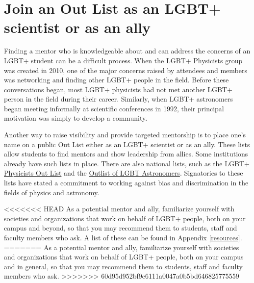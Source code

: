 \section {Join an Out List as an LGBT+ scientist or as an ally}
\label{outlist}
Finding a mentor who is knowledgeable about and can address the concerns of an LGBT+ student can be a difficult process. When the LGBT+ Physicists group was created in 2010, one of the major concerns raised by attendees and members was networking and finding other LGBT+ people in the field. Before these conversations began, most LGBT+ physicists had not met another LGBT+ person in the field during their career.  Similarly, when LGBT+ astronomers began meeting informally at scientific conferences in 1992, their principal motivation was simply to develop a community.

Another way to raise visibility and provide targeted mentorship is to place one's name on a public Out List either as an LGBT+ scientist or as an ally. These lists allow students to find mentors and show leadership from allies. Some institutions already have such lists in place. There are also national lists, such as the \href{http://lgbtphysicists.org/outlist.html}{LGBT+ Physicists Out List} and the \href{http://web.physics.ucsb.edu/~blaes/lgbtastro/}{Outlist of LGBT Astronomers}. Signatories to these lists have stated a commitment to working against bias and discrimination in the fields of physics and astronomy.

<<<<<<< HEAD
As a potential mentor and ally, familiarize yourself with societies and organizations that work on behalf of LGBT+ people, both on your campus and beyond, so that you may recommend them to students, staff and faculty members who ask.  A list of these can be found in Appendix \ref{resources}.
=======
As a potential mentor and ally, familiarize yourself with societies and organizations that work on behalf of LGBT+ people, both on your campus and in general, so that you may recommend them to students, staff and faculty members who ask.
>>>>>>> 60d95d952bf9e6111a0047a0b5bd646825775559


